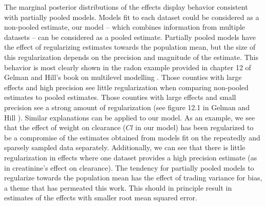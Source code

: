 The marginal posterior distributions of the effects display behavior consistent with partially pooled models.  Models fit to each dataset could be considered as a non-pooled estimate, our model -- which combines information from multiple datasets -- can be considered as a pooled estimate.  Partially pooled models have the effect of regularizing estimates towards the population mean, but the size of this regularization depends on the precision and magnitude of the estimate. This behavior is most clearly shown in the radon example provided in chapter 12 of Gelman and Hill's book on multilevel modelling \cite{@gelman2006data}. Those counties with large effects and high precision see little regularization when comparing non-pooled estimates to pooled estimates.  Those counties with large effects and small precision see a strong amount of regularization (see figure 12.1 in  Gelman and Hill \cite{gelman2006data}). Similar explanations can be applied to our model.  As an example, we see that the effect of weight on clearance ($Cl$ in our model) has been regularized to be a compromise of the estimates obtained from models fit on the repeatedly and sparsely sampled data separately.  Additionally, we can see that there is little regularization in effects where one dataset provides a high precision estimate (as in creatinine's effect on clearance). The tendency for partially pooled models to regularize towards the population mean has the effect of trading variance for bias, a theme that has permeated this work.  This should in principle result in estimates of the effects with smaller root mean squared error.

